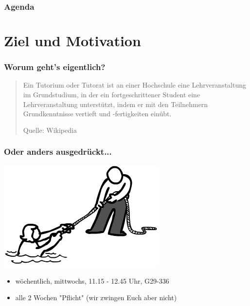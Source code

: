 \documentclass[12pt]{beamer}
\begin{document}
\begin{frame}
	\frametitle{Agenda}
	\tableofcontents
\end{frame}


\section{Ziel und Motivation}

\begin{frame}

\frametitle{Worum geht's eigentlich?}

	\begin{quote}
		Ein Tutorium oder Tutorat ist an einer Hochschule eine Lehrveranstaltung
		im Grundstudium, in der ein fortgeschrittener Student eine
		Lehrveranstaltung unterstützt, indem er mit den Teilnehmern
		Grundkenntnisse vertieft und -fertigkeiten einübt.

		\begin{flushright}
			\scriptsize Quelle: Wikipedia
		\end{flushright}

	\end{quote}
	
\end{frame}

\begin{frame}

	\frametitle{Oder anders ausgedrückt...}

	\pause
	\begin{center}
		\includegraphics[scale=0.42]{src/img/help}
	\end{center}
	\pause

	\begin{itemize}
		\item wöchentlich, mittwochs, 11.15 - 12.45 Uhr, G29-336
		\item alle 2 Wochen "Pflicht" (wir zwingen Euch aber nicht)
	\end{itemize}

\end{frame}
\end{document}
